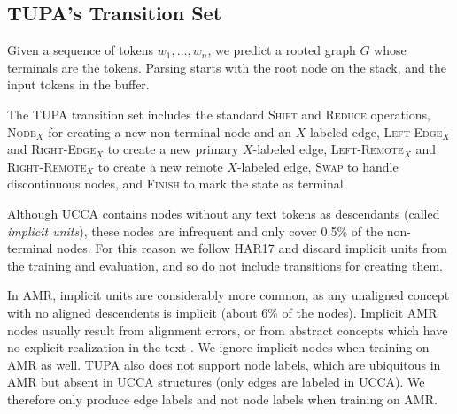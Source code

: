 \documentclass[11pt,a4paper]{article}
\begin{document}
\subsection{TUPA's Transition Set}\label{sec:transition_set}

Given a sequence of tokens $w_1, \ldots, w_n$,
we predict a rooted graph $G$ whose terminals are the tokens.
Parsing starts with the root node on the stack,
and the input tokens in the buffer.

The TUPA transition set includes
the standard \textsc{Shift} and \textsc{Reduce} operations,
\textsc{Node$_X$} for creating a new non-terminal node and an $X$-labeled edge,
\textsc{Left-Edge$_X$} and \textsc{Right-Edge$_X$} to create a new primary $X$-labeled edge,
\textsc{Left-Remote$_X$} and \textsc{Right-Remote$_X$} to create a new remote $X$-labeled edge,
\textsc{Swap} to handle discontinuous nodes,
and \textsc{Finish} to mark the state as terminal.

Although UCCA contains nodes without any text tokens as descendants
(called \textit{implicit units}),
these nodes are infrequent and only cover 0.5\% of the non-terminal nodes.
For this reason we follow HAR17 and discard implicit units from the training and evaluation,
and so do not include transitions for creating them.

In AMR, implicit units are considerably more common, as any unaligned concept
with no aligned descendents is implicit (about 6\% of the nodes).
Implicit AMR nodes usually result from alignment errors, or from abstract concepts
which have no explicit realization in the text \cite{buys2017oxford}.
We ignore implicit nodes when training on AMR as well.
TUPA also does not support node labels, 
which are ubiquitous in AMR but absent in UCCA structures (only edges are labeled in UCCA). 
We therefore only produce edge labels and not node labels when training on AMR.
\end{document}
